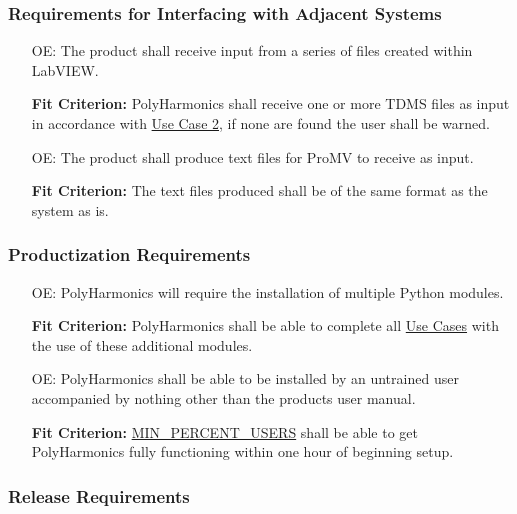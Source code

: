 \documentclass[12pt]{article}
\newcounter{oaenum}
\newcommand{\progname}{PolyHarmonics}
\begin{document}
\subsubsection{Requirements for Interfacing with Adjacent Systems}

\noindent \begin{itemize}
\item[OE\refstepcounter{oaenum}\theoaenum\label{NF_AS1}:] The product shall
  receive input from a series of files created within LabVIEW.

  \textbf{Fit Criterion:} \progname{} shall receive one or more TDMS files as 
input in accordance with \hyperref[UseCase]{Use Case 2}, if none are found
 the user shall be warned.

\item[OE\refstepcounter{oaenum}\theoaenum\label{NF_AS2}:] The product shall
  produce text files for ProMV to receive as input.

  \textbf{Fit Criterion:} The text files produced shall be of the same format as 
the system as is.
\end{itemize}


\subsubsection{Productization Requirements}

\noindent \begin{itemize}
\item[OE\refstepcounter{oaenum}\theoaenum\label{NF_PR1}:] \progname{} will
  require the installation of multiple Python modules.

  \textbf{Fit Criterion:} \progname{} shall be able to complete all
\hyperref[UseCase]{Use Cases} with the use of these additional modules.


\item[OE\refstepcounter{oaenum}\theoaenum\label{NF_PR2}:] \progname{} shall be
  able to be installed by an untrained user accompanied by nothing other than
  the products user manual.

  \textbf{Fit Criterion:} \hyperref[AppendA]{MIN\_PERCENT\_USERS} shall be able
  to get \progname{} fully functioning within one hour of beginning setup.
\end{itemize}

\subsubsection{Release Requirements}
\end{document}
